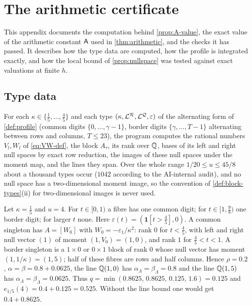 \section{The arithmetic certificate}\label{sec:arith-certificate}

This appendix documents the computation behind \cref{prop:A-value}, the exact value of the
arithmetic constant $\mathsf{A}$ used in \cref{thm:arithmetic}, and the checks it has passed. It
describes how the type data are computed, how the profile is integrated exactly, and how the local
bound of \cref{prop:nullspace} was tested against exact valuations at finite $h$.

\subsection{Type data}\label{subsec:type-data}

For each $\kappa\in\{\frac15,\dots,\frac45\}$ and each type
$(\kappa,\mathcal L^{\mathcal{R}},\mathcal L^{\mathcal{Q}},\varepsilon)$ of the alternating form of
\cref{def:profile} (common digits $\{0,\dots,\gamma-1\}$, border digits $\{\gamma,\dots,T-1\}$ alternating
between rows and columns, $T\le23$), the program computes the rational numbers $V_l,W_l$ of
\eqref{eq:VW-def}, the block $A_\tau$, its rank over $\mathbb{Q}$, bases of its left and right null spaces
by exact row reduction, the images of these null spaces under the moment map, and the lines they
span. Over the whole range $1/20\le u\le45/8$ about a thousand types occur ($1042$
according to the AI-internal audit), and no null space has a two-dimensional moment image, so the
convention of \cref{def:block-types}(ii) for two-dimensional images is never used.

\begin{example}\label{ex:profile-x4}
Let $\kappa=\frac15$ and $u=4$. For $t\in[0,1)$ a fibre has one common digit; for
$t\in[1,\frac98)$ one border digit; for larger $t$ none. Here $\varepsilon(t)=(\mathbf1[t>\frac45],0)$.
A common singleton has $A=[W_0]$ with $W_0=-\varepsilon_1/\kappa^2$: rank $0$ for $t<\frac45$, with
left and right null vector $(1)$ of moment $(1,V_0)=(1,0)$, and rank $1$ for $\frac45<t<1$. A border
singleton is a $1\times0$ or $0\times1$ block of rank $0$ whose null vector has moment
$(1,1/\kappa)=(1,5)$; half of these fibres are rows and half columns. Hence $\rho=0.2$,
$\alpha=\beta=0.8+0.0625$, the line $\mathbb{Q}(1,0)$ has $\alpha_\Lambda=\beta_\Lambda=0.8$ and the line
$\mathbb{Q}(1,5)$ has $\alpha_\Lambda=\beta_\Lambda=0.0625$. Thus $q=\min(0.8625,\,0.8625,\,0.125,\,1.6)=0.125$
and $e_{1/5}(4)=0.4+0.125=0.525$. Without the line bound one would get $0.4+0.8625$.
\end{example}

